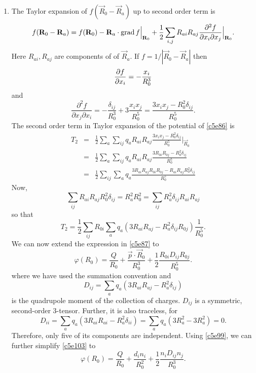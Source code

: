 \begin{enumerate}
\item The Taylor expansion of $f(\vec{R}_0-\vec{R}_a)$ up to second order term is
\begin{equation}\label{c5e102}
f(\mathbf{R}_0-\mathbf{R}_a) = f(\mathbf{R}_0) - \mathbf{R}_a\cdot\operatorname{grad} f\Big|_{\mathbf{R}_0} +
\frac{1}{2}\sum_{i, j}R_{ai}R_{aj}
\frac{\partial^2 f}{\partial x_i\partial x_j}\Big|_{\mathbf{R}_0}.
\end{equation}
Here $R_{ai}, R_{aj}$ are components of of $\vec{R}_a$.
If $f = 1/|\vec{R}_0-\vec{R}_a|$ then
\[
\frac{\partial{f}}{\partial{x_i}} = -\frac{x_i}{R_0^3}
\]
and
\[
\frac{\partial^2 f}{\partial x_j\partial x_i} = -\frac{\delta_{ij}}{R_0^3} + 3\frac{x_ix_j}{R_0^5}
= \frac{3x_ix_j - R_0^2\delta_{ij}}{R_0^5}.
\]
The second order term in Taylor expansion of the potential of \eqref{c5e86} is
\begin{eqnarray*}
T_2 &=& \frac{1}{2}\sum_a\sum_{ij} q_aR_{ai}R_{aj}\frac{3x_ix_j - R_0^2\delta_{ij}}{R_0^5}\Big|_{\vec{R}_0} \\
 &=& \frac{1}{2}\sum_a\sum_{ij} q_aR_{ai}R_{aj}\frac{3R_{0i}R_{0j} - R_0^2\delta_{ij}}{R_0^5} \\
 &=& \frac{1}{2}\sum_{ij}\sum_a q_a\frac{3R_{ai}R_{aj}R_{0i}R_{0j} - R_{ai}R_{aj}R_0^2\delta_{ij}}{R_0^5}
\end{eqnarray*}
Now,
\[
\sum_{ij}R_{ai}R_{aj}R_0^2\delta_{ij} = R_a^2R_0^2 = \sum_{ij}R_a^2\delta_{ij}R_{ai}R_{aj}
\]
so that
\[
T_2 = \frac{1}{2}\sum_{ij}R_{0i}\sum_a q_a(3R_{ai}R_{aj} - R_a^2\delta_{ij}R_{0j})\frac{1}{R_0^5}.
\]
We can now extend the expression in \eqref{c5e87} to
\begin{equation}\label{c5e103}
\varphi(R_0) = \frac{Q}{R_0} + \frac{\vec{p}\cdot\vec{R}_0}{R_0^3} + 
\frac{1}{2}\frac{R_{0i}D_{ij}R_{0j}}{R_0^5}.
\end{equation}
where we have used the summation convention and
\begin{equation}\label{c5e104}
D_{ij} = \sum_a q_a(3R_{ai}R_{aj} - R_a^2\delta_{ij})
\end{equation}
is the quadrupole moment of the collection of charges. $D_{ij}$ is a symmetric,
second-order 3-tensor. Further, it is also traceless, for
\[
D_{ii} = \sum_a q_a(3R_{ai}R_{ai} - R_a^2\delta_{ii}) = \sum_a q_a(3R_a^2 - 3R_a^2) = 0.
\]
Therefore, only five of its components are independent. Using \eqref{c5e99}, we
can further simplify \eqref{c5e103} to
\begin{equation}\label{c5e105}
\varphi(R_0) = \frac{Q}{R_0} + \frac{d_in_i}{R_0^2} + 
\frac{1}{2}\frac{n_iD_{ij}n_j}{R_0^3}.
\end{equation}


\end{enumerate}
